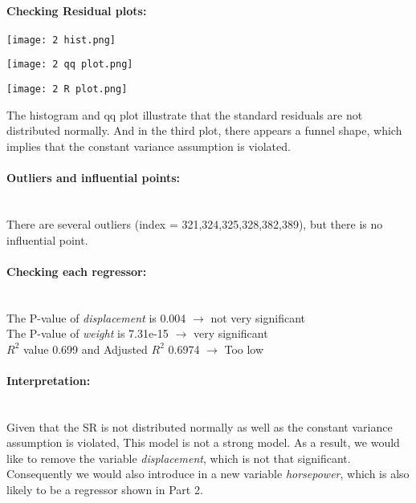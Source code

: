 \documentclass[12pt]{article}
\begin{document}
\paragraph{Checking Residual plots:}
\begin{minipage}{\textwidth}
    \begin{minipage}[h]{0.3\linewidth}
        \centering
        \texttt{[image: 2 hist.png]}
        \label{a}
    \end{minipage}
    \begin{minipage}[h]{0.3\linewidth}
        \centering
        \texttt{[image: 2 qq plot.png]}
        \label{b}   
    \end{minipage}
    \begin{minipage}[h]{0.3\linewidth}
        \centering
        \texttt{[image: 2 R plot.png]}
        \label{b}   
    \end{minipage}
\end{minipage}
The histogram and qq plot illustrate that the standard residuals are not distributed normally. And in the third plot, there appears a funnel shape, which implies that the constant variance assumption is violated.\\ 


\paragraph{Outliers and influential points:}~{}
\\There are several outliers (index = 321,324,325,328,382,389), but there is no influential point.
\\

\paragraph{Checking each regressor:}~{}\\
The P-value of \textit{displacement} is 0.004 $\longrightarrow$ not very significant\\
The P-value of \textit{weight} is 7.31e-15 $\longrightarrow$ very significant\\
$R^2$ value 0.699 and Adjusted $R^2$  0.6974 $\longrightarrow$ Too low

\paragraph{Interpretation:}~{}\\
Given that the SR is not distributed normally as well as the constant variance assumption is violated, This model is not a strong model. As a result, we would like to remove the variable \textit{displacement}, which is not that significant. Consequently we would also introduce in a new variable \textit{horsepower}, which is also likely to be a regressor shown in Part 2.
\end{document}
